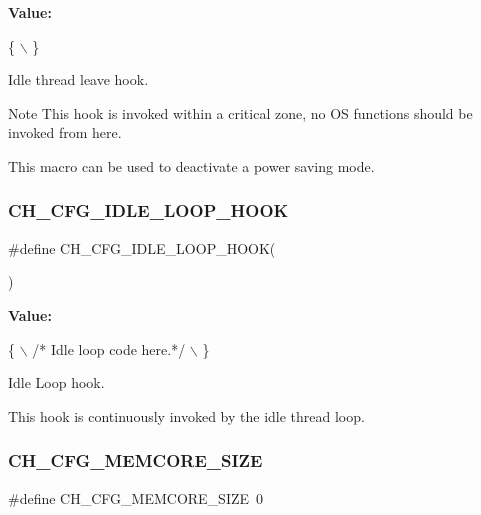 {\bfseries Value\+:}
\begin{DoxyCode}
\{                                          \(\backslash\)
\}
\end{DoxyCode}


Idle thread leave hook. 

\begin{DoxyNote}{Note}
This hook is invoked within a critical zone, no OS functions should be invoked from here. 

This macro can be used to deactivate a power saving mode. 
\end{DoxyNote}
\hypertarget{group__config_gad22892d2984f5289c63f963622e7f2af}{}\label{group__config_gad22892d2984f5289c63f963622e7f2af} 
\subsubsection{\texorpdfstring{C\+H\+\_\+\+C\+F\+G\+\_\+\+I\+D\+L\+E\+\_\+\+L\+O\+O\+P\+\_\+\+H\+O\+OK}{CH\_CFG\_IDLE\_LOOP\_HOOK}}
{\footnotesize\ttfamily \#define C\+H\+\_\+\+C\+F\+G\+\_\+\+I\+D\+L\+E\+\_\+\+L\+O\+O\+P\+\_\+\+H\+O\+OK(\begin{DoxyParamCaption}{ }\end{DoxyParamCaption})}

{\bfseries Value\+:}
\begin{DoxyCode}
\{                                           \(\backslash\)
  \textcolor{comment}{/* Idle loop code here.*/}                                                 \(\backslash\)
\}
\end{DoxyCode}


Idle Loop hook. 

This hook is continuously invoked by the idle thread loop. \hypertarget{group__config_ga185a9549f0d212530070e806680c4949}{}\label{group__config_ga185a9549f0d212530070e806680c4949} 
\subsubsection{\texorpdfstring{C\+H\+\_\+\+C\+F\+G\+\_\+\+M\+E\+M\+C\+O\+R\+E\+\_\+\+S\+I\+ZE}{CH\_CFG\_MEMCORE\_SIZE}}
{\footnotesize\ttfamily \#define C\+H\+\_\+\+C\+F\+G\+\_\+\+M\+E\+M\+C\+O\+R\+E\+\_\+\+S\+I\+ZE~0}




